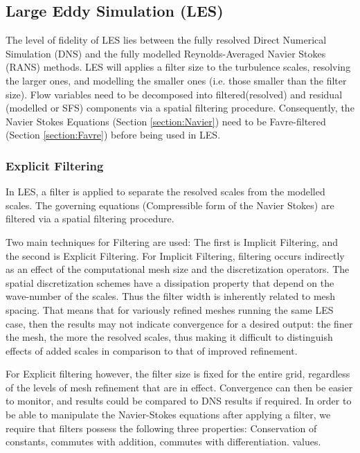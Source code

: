 \subsection{Large Eddy Simulation (LES)}
The level of fidelity of LES lies between the fully resolved Direct Numerical Simulation (DNS) and the fully modelled Reynolds-Averaged Navier Stokes (RANS) methods. LES will applies a filter size to the turbulence scales, resolving the larger ones, and modelling the smaller ones (i.e. those smaller than the filter size). Flow variables need to be decomposed into filtered(resolved) and residual (modelled or SFS) components via a spatial filtering procedure. Consequently, the Navier Stokes Equations (Section \ref{section:Navier}) need to be Favre-filtered (Section \ref{section:Favre}) before being used in LES.\par  

\subsubsection{Explicit Filtering} \label{section:Explicit Filtering}
In LES, a filter is applied to separate the resolved scales from the modelled scales. The governing equations (Compressible form of the Navier Stokes) are filtered via a spatial filtering procedure.\par

Two main techniques for Filtering are used: The first is Implicit Filtering, and the second is Explicit Filtering. For Implicit Filtering, filtering occurs indirectly as an effect of the computational mesh size and the discretization operators. The spatial discretization schemes have a dissipation property that depend on the wave-number of the scales. Thus the filter width is inherently related to mesh spacing. That means that for variously refined meshes running the same LES case, then the results may not indicate convergence for a desired output: the finer the mesh, the more the resolved scales, thus making it difficult to distinguish effects of added scales in comparison to that of improved refinement.\par

For Explicit filtering however, the filter size is fixed for the entire grid, regardless of the levels of mesh refinement that are in effect. Convergence can then be easier to monitor, and results could be compared to DNS results if required. In order to be able to manipulate the Navier-Stokes equations after applying a filter, we require that filters possess the following three properties: Conservation of constants, commutes with addition, commutes with differentiation. values.\par



